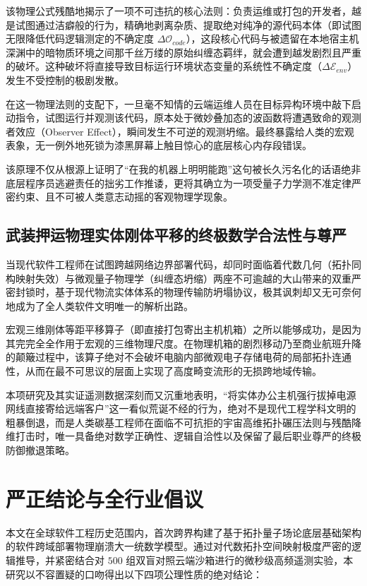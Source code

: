 \documentclass[journal]{IEEEtran}
\begin{document}
该物理公式残酷地揭示了一项不可违抗的核心法则：负责运维或打包的开发者，越是试图通过洁癖般的行为，精确地剥离杂质、提取绝对纯净的源代码本体（即试图无限降低代码逻辑测定的不确定度 $\Delta \mathcal{O}_{code}$），这段核心代码与被遗留在本地宿主机深渊中的暗物质环境之间那千丝万缕的原始纠缠态羁绊，就会遭到越发剧烈且严重的破坏。这种破坏将直接导致目标运行环境状态变量的系统性不确定度（$\Delta \mathcal{E}_{env}$）发生不受控制的极剧发散。

在这一物理法则的支配下，一旦毫不知情的云端运维人员在目标异构环境中敲下启动指令，试图运行并观测该代码，原本处于微妙叠加态的波函数将遭遇致命的观测者效应（Observer Effect），瞬间发生不可逆的观测坍缩。最终暴露给人类的宏观表象，无一例外地死锁为漆黑屏幕上触目惊心的底层核心内存段错误。

该原理不仅从根源上证明了“在我的机器上明明能跑”这句被长久污名化的话语绝非底层程序员逃避责任的拙劣工作推诿，更将其确立为一项受量子力学测不准定律严密约束、且不可被人类意志动摇的客观物理学现象。

\subsection{武装押运物理实体刚体平移的终极数学合法性与尊严}
当现代软件工程师在试图跨越网络边界部署代码，却同时面临着代数几何（拓扑同构映射失效）与微观量子物理学（纠缠态坍缩）两座不可逾越的大山带来的双重严密封锁时，基于现代物流实体体系的物理传输防坍塌协议，极其讽刺却又无可奈何地成为了全人类软件文明唯一的解析出路。

宏观三维刚体等距平移算子（即直接打包寄出主机机箱）之所以能够成功，是因为其完完全全作用于宏观的三维物理尺度。在物理机箱的剧烈移动乃至商业航班升降的颠簸过程中，该算子绝对不会破坏电脑内部微观电子存储电荷的局部拓扑连通性，从而在最不可思议的层面上实现了高度畸变流形的无损跨地域传输。

本项研究及其实证遥测数据深刻而又沉重地表明，“将实体办公主机强行拔掉电源网线直接寄给远端客户”这一看似荒诞不经的行为，绝对不是现代工程学科文明的粗暴倒退，而是人类碳基工程师在面临不可抗拒的宇宙高维拓扑碾压法则与残酷降维打击时，唯一具备绝对数学正确性、逻辑自洽性以及保留了最后职业尊严的终极防御撤退策略。

\section{严正结论与全行业倡议}

本文在全球软件工程历史范围内，首次跨界构建了基于拓扑量子场论底层基础架构的软件跨域部署物理崩溃大一统数学模型。通过对代数拓扑空间映射极度严密的逻辑推导，并紧密结合对 $500$ 组双盲对照云端沙箱进行的微秒级高频遥测实验，本研究以不容置疑的口吻得出以下四项公理性质的绝对结论：
\end{document}
